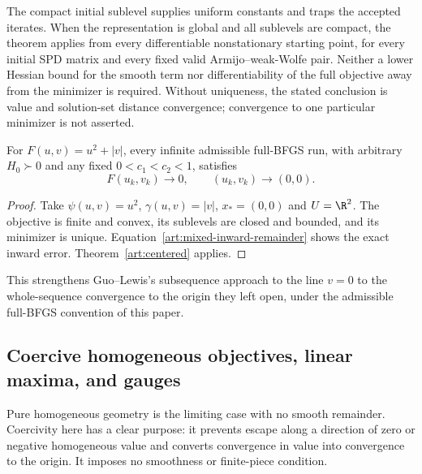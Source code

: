 The compact initial sublevel supplies uniform constants and traps the accepted
iterates. When the representation is global and all sublevels are compact,
the theorem applies from every differentiable nonstationary starting point,
for every initial SPD matrix and every fixed valid Armijo--weak-Wolfe pair.
Neither a lower Hessian bound for the smooth term nor differentiability of
the full objective away from the minimizer is required. Without uniqueness,
the stated conclusion is value and solution-set distance convergence;
convergence to one particular minimizer is not asserted.

\begin{corollary}\label{art:mixed-benchmark}
For $F(u,v)=u^2+|v|$, every infinite admissible full-BFGS run, with arbitrary
$H_0\succ0$ and any fixed $0<c_1<c_2<1$, satisfies
\[
 F(u_k,v_k)\longrightarrow0,\qquad (u_k,v_k)\longrightarrow(0,0).
\]
\end{corollary}
\begin{proof}
Take $\psi(u,v)=u^2$, $\gamma(u,v)=|v|$, $x_*=(0,0)$ and $U=\R^2$.
The objective is finite and convex, its sublevels are closed and bounded,
and its minimizer is unique. Equation~\eqref{art:mixed-inward-remainder}
shows the exact inward error. Theorem~\ref{art:centered} applies.
\end{proof}

This strengthens Guo--Lewis's subsequence approach to the line $v=0$
\cite[Corollary~4.4]{GL18} to the whole-sequence convergence to the origin
they left open, under the admissible full-BFGS convention of this paper.

\subsection{Coercive homogeneous objectives, linear maxima, and gauges}

Pure homogeneous geometry is the limiting case with no smooth remainder.
Coercivity here has a clear purpose: it prevents escape along a direction of
zero or negative homogeneous value and converts convergence in value into
convergence to the origin. It imposes no smoothness or finite-piece condition.

